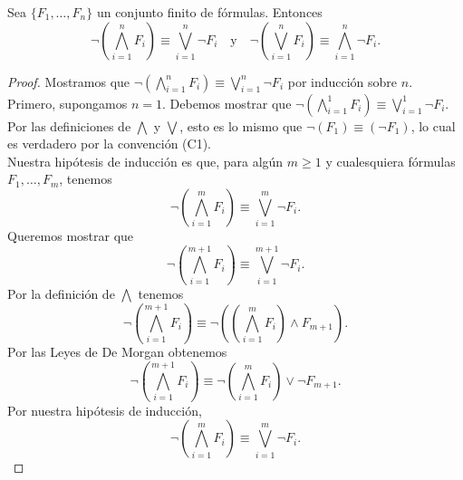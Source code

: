 \message{ !name(main.tex)}\documentclass[12pt,a4paper]{book}
\begin{document}
    \begin{proposicion}\label{prop:demorgan-generalizado}
        Sea $\{F_{1},\dots,F_{n}\}$ un conjunto finito de fórmulas. Entonces
        \begin{equation*}
            \neg\left(\bigwedge_{i=1}^{n}F_{i}\right)\equiv\bigvee_{i=1}^{n}\neg F_{i}\quad\text{y}\quad
            \neg\left(\bigvee_{i=1}^{n}F_{i}\right)\equiv\bigwedge_{i=1}^{n}\neg F_{i}.
        \end{equation*}
    \end{proposicion}
    \begin{proof}
        Mostramos que $\neg\left(\bigwedge_{i=1}^{n}F_{i}\right)\equiv\bigvee_{i=1}^{n}\neg F_{i}$ por inducción sobre $n$.\\
        Primero, supongamos $n=1$. Debemos mostrar que $\neg\left(\bigwedge_{i=1}^{1}F_{i}\right)\equiv\bigvee_{i=1}^{1}\neg F_{i}$.
        Por las definiciones de $\bigwedge$ y $\bigvee$, esto es lo mismo que $\neg(F_{1})\equiv(\neg F_{1})$, lo cual es
        verdadero por la convención (C1).\\
        Nuestra hipótesis de inducción es que, para algún $m\geq 1$ y cualesquiera fórmulas $F_{1},\dots,F_{m}$, tenemos
        \begin{equation*}
            \neg\left(\bigwedge_{i=1}^{m}F_{i}\right)\equiv\bigvee_{i=1}^{m}\neg F_{i}.
        \end{equation*}
        Queremos mostrar que
        \begin{equation*}
            \neg\left(\bigwedge_{i=1}^{m+1}F_{i}\right)\equiv\bigvee_{i=1}^{m+1}\neg F_{i}.
        \end{equation*}
        Por la definición de $\bigwedge$ tenemos
        \begin{equation*}
            \neg\left(\bigwedge_{i=1}^{m+1}F_{i}\right)\equiv\neg\left(\left(\bigwedge_{i=1}^{m}F_{i}\right)\wedge F_{m+1}\right).
        \end{equation*}
        Por las Leyes de De Morgan obtenemos
        \begin{equation}\label{eq:demorgan-gen-1}
            \neg\left(\bigwedge_{i=1}^{m+1}F_{i}\right)\equiv\neg\left(\bigwedge_{i=1}^{m}F_{i}\right)\vee\neg F_{m+1}.
        \end{equation}
        Por nuestra hipótesis de inducción,
        \begin{equation*}
            \neg\left(\bigwedge_{i=1}^{m}F_{i}\right)\equiv\bigvee_{i=1}^{m}\neg F_{i}.
        \end{equation*}

\end{proof}
\end{document}
